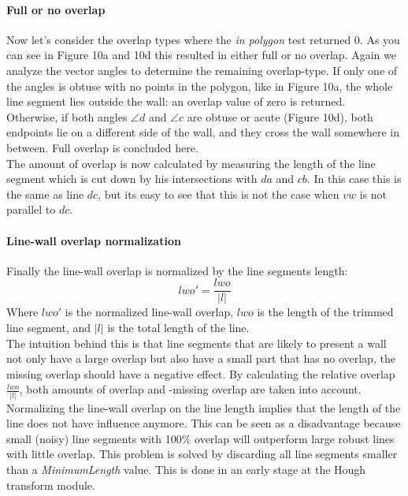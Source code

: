	\paragraph{Full or no overlap}
	Now let's consider the overlap types where the \emph{in polygon} test
	returned 0.
	As you can see in Figure 10a and 10d this resulted in either full or no overlap.
	Again we analyze the vector angles to determine the remaining overlap-type.
	If only one of the angles is obtuse with no points in the polygon, like in Figure 10a,
	the whole line segment lies outside the wall: an overlap value of zero
	is returned.\\
	Otherwise, if both angles $\angle d$ and $\angle c$ are obtuse or acute (Figure 10d),
	both endpoints lie on a different side of the wall, and they cross the wall somewhere in
	between. Full overlap is concluded here. \\
	The amount of overlap is now calculated by measuring the length
	of the line segment which is cut down by his intersections with $da$ and
	$cb$. In this case this is the same as line $dc$, but its easy to see that
	this is not the case when $vw$ is not parallel to $dc$.\\
	
	\paragraph{Line-wall overlap normalization}
	Finally the line-wall overlap is normalized by the line segments length:\\
	\begin{equation}
		lwo' =  \frac{lwo}{|l|}
	\end{equation}
	Where $lwo'$ is the normalized line-wall overlap, $lwo$ is the length of
	the trimmed line segment, and $|l|$ is the total length of the line.\\
	The intuition behind this is that line segments that are likely to
	present a wall not only have a large overlap but also have a small part
	that has no overlap, the missing overlap should have a negative effect. By
	calculating the relative overlap $\frac{lwo}{|l|}$, both amounts of overlap and -missing
	overlap are taken into account.\\

	Normalizing the line-wall overlap on the line length implies that the length
	of the line does not have influence anymore.  This can be seen as a
	disadvantage because small (noisy) line segments with 100\% overlap will
	outperform large robust lines with little overlap.  This problem is solved
	by discarding all line segments smaller than a \emph{MinimumLength} value.
	This is done in an early stage at the Hough transform module. \\

